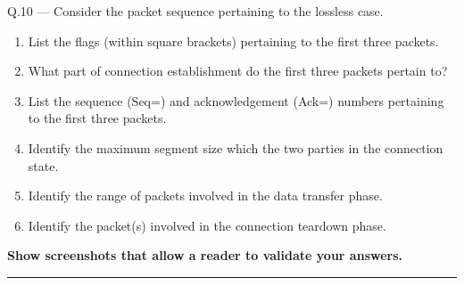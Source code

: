 \documentclass{article}
\newcommand\Que[2]{%
\begin{samepage}
\leavevmode\par
\noindent
Q.#1 --- #2\par\vspace{10pt}\hrule\vspace{10pt}
\end{samepage}}
\begin{document}
\Que{10}{
Consider the packet sequence pertaining to the lossless case.
\begin{enumerate}
\item List the flags (within square brackets) pertaining to the
      first three packets.
\item What part of connection establishment do the first three
      packets pertain to?
\item List the sequence (Seq=) and acknowledgement (Ack=) numbers
      pertaining to the first three packets.
\item Identify the maximum segment size which the two parties in
      the connection state.
\item Identify the range of packets involved in the data transfer
      phase.
\item Identify the packet(s) involved in the connection teardown
      phase.
\end{enumerate}

\textbf{Show screenshots that allow a reader to validate your answers.}}
\end{document}
